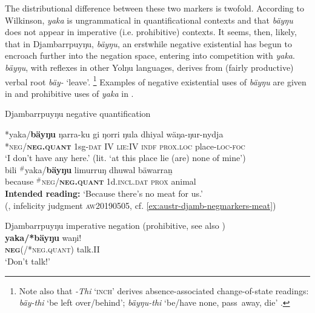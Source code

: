 \documentclass[output=paper,draft,draftmode,colorlinks,citecolor=brown]{langscibook}
\begin{document}
The distributional difference between these two markers is twofold.
    According to Wilkinson, \textit{yaka} is ungrammatical in
    quantificational contexts and that \textit{bäyŋu} does not appear in
    imperative (i.e. prohibitive) contexts. It seems, then,
    likely, that in Djambarrpuyŋu, \textit{bäyŋu}, an erstwhile negative
    existential has begun to encroach further into the negation space,
    entering into competition with \textit{yaka}. \textit{bäyŋu}, with
    reflexes in other Yolŋu languages, derives from (fairly productive)
    verbal root \textit{bäy-} `leave'.%
%
\footnote{Note also that \textit{-Thi} `\textsc{inch}' derives
    absence-associated change-of-state readings: \textit{bäy-thi} `be left
    over\slash behind'; \textit{bäyŋu-thi} `be\slash have none, pass~away,
    die' \citep[378]{Wilkinson1991}.} 
%
Examples of negative existential uses of \textit{bäyŋu} are given in
     and prohibitive uses of
    \textit{yaka} in .
%
\begin{exe}\ex\label{ex:austr-djamb-neg-quantities} Djambarrpuyŋu negative quantification
    \begin{xlist}
\ex \gll {\op}*yaka/{\cp}\textbf{bäyŋu} ŋarra-ku gi ŋorri ŋula dhiyal wäŋa-ŋur-nydja\\
	\textsc{*neg/\textbf{neg.quant}} 1sg\textsc{-dat} \textsc{IV} \textsc{lie:IV} \textsc{indf} \textsc{prox.loc} place-\textsc{loc-foc}\\
	\glt `I don't have any here.' (lit. `at this place lie (are) none of
        mine') \\\citep[691]{Wilkinson1991}
%	
\ex\gll bili {\op}$^\#$yaka/{\cp}\textbf{bäyŋu} limurruŋ dhuwal bäwarraṉ\\
because \textsc{$^\#$neg/\textbf{neg.quant}} 1d.\textsc{incl.dat} \textsc{prox} animal\\
\glt \textbf{Intended reading:} `Because there's no meat for us.' \\ 
         (\citealp[560]{Wilkinson1991}, infelicity judgment
        \textsc{aw20190505}, cf. \ref{ex:austr-djamb-negmarkers-meat})
    \end{xlist}
%
\ex\label{ex:austr-djamb-prohib} 
Djambarrpuyŋu imperative negation (prohibitive, see also )\\
\gll \textbf{yaka{\op}/*bäyŋu{\cp}} waŋi!\\
\textsc{\textbf{neg}(/*neg.quant)} talk.II\\
\glt `Don't talk!'  {\citep[360]{Wilkinson1991}}\\\end{exe}
\end{document}
